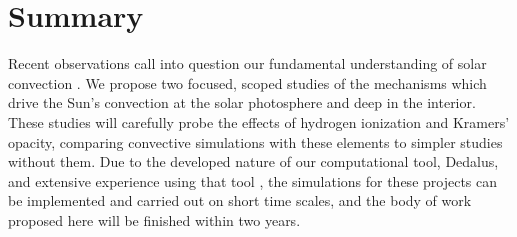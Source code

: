\documentclass[aasms,12pt]{article}
\begin{document}
\section{Summary}
Recent observations call into question our fundamental understanding of solar
convection \citep{hanasoge&all2012, greer&all2015, hathaway&all2015}.
We propose two focused, scoped studies of the mechanisms which drive the Sun's convection at
the solar photosphere and deep in the interior.
These studies will carefully probe the effects of hydrogen ionization and Kramers' opacity, comparing
convective simulations with these elements to simpler studies without them.
Due to the developed nature of
our computational tool, Dedalus, and extensive experience using that tool \citep{anders&brown2017},
the simulations for these projects can be implemented and
carried out on short time scales, and the body of work proposed here will be finished within
two years.


\newpage


\end{document}
